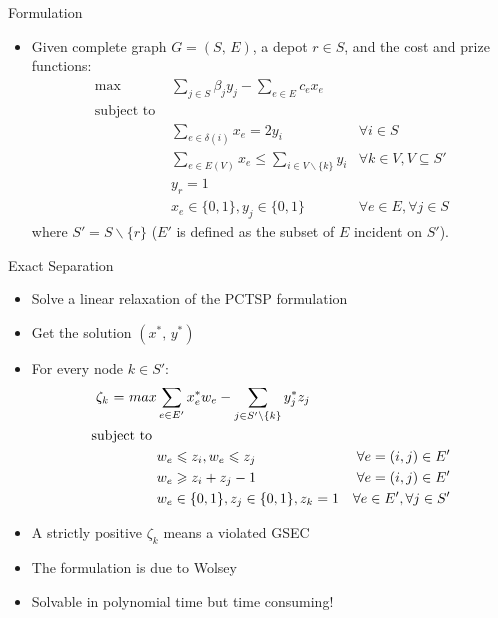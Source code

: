 \documentclass[10pt]{beamer}
\begin{document}
\begin{frame}[fragile]{Formulation}
\begin{itemize}
\item<1-> Given complete graph $G = (S, \, E)$, a depot $r \in S$, and the cost and prize functions:
\begin{align} 
\text {max } \label{sp_obj}     & \sum_{j\in S} \beta_j y_j  - \sum_{e\in E} c_e x_e &
 \\
\text{subject to } \nonumber    &  & \\
\label{const:sp1}               & \sum_{e \in \delta(i)} x_e = 2 y_{i}  & \forall i \in S \\
\label{const:sp2}               & \sum_{e \in E(V) } x_e \leq \sum_{i \in V \backslash\{ k \}} y_{i} & \forall k \in V, V\subseteq S' \\
\label{const:sp3}               & y_r = 1 \\
\label{const:sp4}               & x_e \in \{0,1\}, y_j \in \{0,1\}  & \forall e \in E, \forall j \in S 
\end{align}
where $S' = S \backslash \{r\}$ ($E'$ is defined as the subset of $E$ incident on $S'$).
\end{itemize}
\end{frame}



\begin{frame}[fragile]{Exact Separation}
\begin{itemize}
\item<1-> Solve a linear relaxation of the PCTSP formulation
\item<2-> Get the solution $(x^*, \, y^*)$ 
\item<3-> For every node $k \in S'$:
\begin{align} 
\zeta_k \ \text  = \ {max } \label{sep_obj} & \sum_{e\in E'} x_e^{*} w_e  - \sum_{j \in S' \backslash \{ k \}}  y_j^{*} z_j     &  \\
\text{subject to }                          & & \nonumber \\
\label{const:sep1}                          & w_e\leq z_i, w_e\leq z_j  & \forall e =(i,j) \in E' \\
\label{const:sep2}                          & w_e \geq z_i + z_j - 1    & \forall e = (i,j) \in E' \\
\label{const:sep3}                          & w_e \in \{0,1\}, z_j \in \{0,1\}, z_k = 1   & \forall e \in E', \forall j \in S'
\end{align}
\item<4-> A strictly positive $\zeta_k$ means a violated GSEC
\item<5-> The formulation is due to Wolsey \cite{Wolsey98}
\item<6-> Solvable in polynomial time but \alert{time consuming!}
\end{itemize}
\end{frame}
\end{document}
